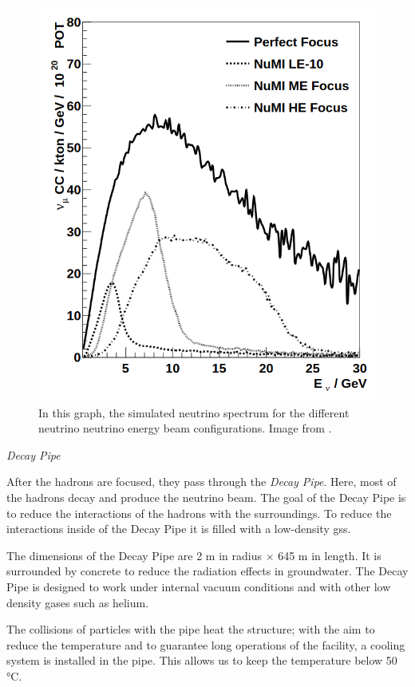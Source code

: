 \begin{figure}[!htb]
\centering
\includegraphics[scale=0.3]{Figures/Chapter2/nuAllSpectrums.png}
        \caption{In this graph, the simulated neutrino spectrum for the different neutrino neutrino energy beam configurations. Image from \cite{Numi}.} 
\label{fig:MnvExp:NuMI:Neutrino spectrum}
\end{figure}

\textit{Decay Pipe}

After the hadrons are focused, they pass through the \textit{Decay Pipe}. Here, most of the hadrons decay and produce the neutrino beam. The goal of the Decay Pipe is to reduce the interactions of the hadrons with the surroundings. To reduce the interactions inside of the Decay Pipe it is filled with a low-density gss. 

The dimensions of the Decay Pipe are 2 m in radius $\times$ 645 m in length. It is surrounded by concrete to reduce the radiation effects in groundwater. The Decay Pipe is designed to work under internal vacuum conditions and with other low density gases such as helium. 

The collisions of particles with the pipe heat the structure; with the aim to reduce the temperature and to guarantee long operations of the facility, a cooling system is installed in the pipe. This allows us to keep the temperature below 50 °C. 

